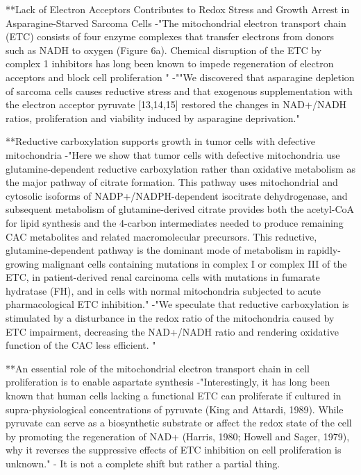 \documentclass[11pt,a4paper]{article}
\begin{document}
**Lack of Electron Acceptors Contributes to Redox Stress and Growth Arrest in Asparagine-Starved Sarcoma Cells
-"The mitochondrial electron transport chain (ETC) consists of four enzyme complexes that transfer electrons from donors such as NADH to oxygen (Figure 6a). Chemical disruption of the ETC by complex 1 inhibitors has long been known to impede regeneration of electron acceptors and block cell proliferation "
-""We discovered that asparagine depletion of sarcoma cells causes reductive stress and that exogenous supplementation with the electron acceptor pyruvate [13,14,15] restored the changes in NAD+/NADH ratios, proliferation and viability induced by asparagine deprivation."

**Reductive carboxylation supports growth in tumor cells with defective mitochondria
-"Here we show that tumor cells with defective mitochondria use glutamine-dependent reductive carboxylation rather than oxidative metabolism as the major pathway of citrate formation. This pathway uses mitochondrial and cytosolic isoforms of NADP+/NADPH-dependent isocitrate dehydrogenase, and subsequent metabolism of glutamine-derived citrate provides both the acetyl-CoA for lipid synthesis and the 4-carbon intermediates needed to produce remaining CAC metabolites and related macromolecular precursors. This reductive, glutamine-dependent pathway is the dominant mode of metabolism in rapidly-growing malignant cells containing mutations in complex I or complex III of the ETC, in patient-derived renal carcinoma cells with mutations in fumarate hydratase (FH), and in cells with normal mitochondria subjected to acute pharmacological ETC inhibition."
-"We speculate that reductive carboxylation is stimulated by a disturbance in the redox ratio of the mitochondria caused by ETC impairment, decreasing the NAD+/NADH ratio and rendering oxidative function of the CAC less efficient. "

**An essential role of the mitochondrial electron transport chain in cell proliferation is to enable aspartate synthesis
-"Interestingly, it has long been known that human cells lacking a functional ETC can proliferate if cultured in supra-physiological concentrations of pyruvate (King and Attardi, 1989). While pyruvate can serve as a biosynthetic substrate or affect the redox state of the cell by promoting the regeneration of NAD+ (Harris, 1980; Howell and Sager, 1979), why it reverses the suppressive effects of ETC inhibition on cell proliferation is unknown."
- It is not a complete shift but rather a partial thing.
\end{document}
